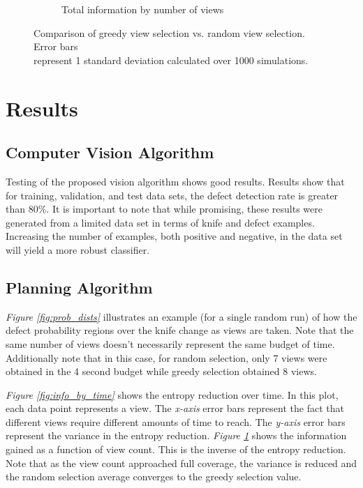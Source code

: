 \documentclass[letterpaper, 10 pt, conference]{ieeeconf}  %
\begin{document}
\begin{figure}
\begin{subfigure}[b]{.49\textwidth}
        \caption{Total information by number of views}
        \vspace*{2mm}
        \label{fig:info_by_view}
    \end{subfigure}
    \caption{Comparison of greedy view selection vs. random view selection. Error bars \\ represent 1 standard deviation calculated over 1000 simulations.}
    \label{fig:info gains}
\end{figure}

\section{Results}

\subsection{Computer Vision Algorithm}

Testing of the proposed vision algorithm shows good results. Results show that for training, validation, and test data sets, the defect detection rate is greater than 80\%. It is important to note that while promising, these results were generated from a limited data set in terms of knife and defect examples. Increasing the number of examples, both positive and negative, in the data set will yield a more robust classifier.

\subsection{Planning Algorithm}

\textit{Figure \ref{fig:prob_dists}} illustrates an example (for a single random run) of how the defect probability regions over the knife change as views are taken. Note that the same number of views doesn't necessarily represent the same budget of time. Additionally note that in this case, for random selection, only 7 views were obtained in the 4 second budget while greedy selection obtained 8 views.

\textit{Figure \ref{fig:info_by_time}} shows the entropy reduction over time. In this plot, each data point represents a view. The \textit{x-axis} error bars represent the fact that different views require different amounts of time to reach. The \textit{y-axis} error bars represent the variance in the entropy reduction. \textit{Figure \ref{fig:info_by_view}} shows the information gained as a function of view count. This is the inverse of the entropy reduction. Note that as the view count approached full coverage, the variance is reduced and the random selection average converges to the greedy selection value.
\end{document}
